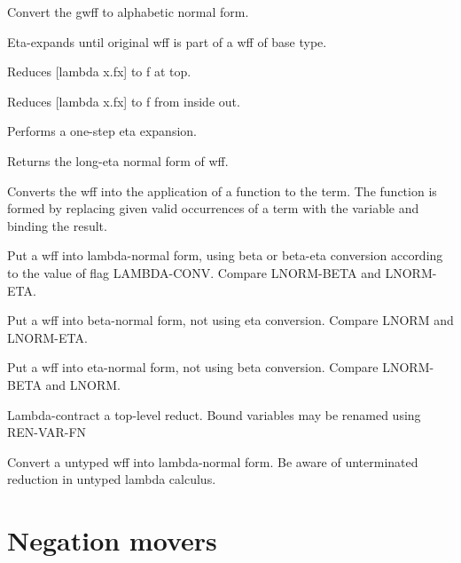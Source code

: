 \begin{description} 
\item[ABNORM]  
Convert the gwff to alphabetic normal form. 

\item[ETAB]  
Eta-expands until original wff is part of a wff of base type.

\item[ETAC]  
Reduces [lambda x.fx] to f at top.

\item[ETAN]  
Reduces [lambda x.fx] to f from inside out.

\item[ETAX]  
Performs a one-step eta expansion.

\item[LETA]  
Returns the long-eta normal form of wff.

\item[LEXP]  
Converts the wff into the application of a function to the term.
The function is formed by replacing given valid occurrences of a term
with the variable and binding the result.

\item[LNORM]  
Put a wff into lambda-normal form, using beta or beta-eta conversion 
according to the value of flag LAMBDA-CONV. Compare LNORM-BETA and LNORM-ETA.

\item[LNORM-BETA]  
Put a wff into beta-normal form, not using eta 
conversion. Compare LNORM and LNORM-ETA.

\item[LNORM-ETA]  
Put a wff into eta-normal form, not using beta
conversion. Compare LNORM-BETA and LNORM.

\item[RED]  
Lambda-contract a top-level reduct.
Bound variables may be renamed using REN-VAR-FN

\item[ULNORM]  
Convert a untyped wff into lambda-normal form. Be aware of unterminated reduction 
in untyped lambda calculus.
\item
\end{description}

\section{Negation movers}

